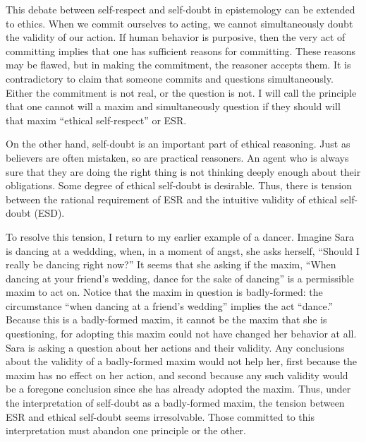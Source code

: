 \begin{isabellebody}
\begin{isamarkuptext}
This debate between self-respect and self-doubt in epistemology can be extended to ethics. When we 
commit ourselves to acting, we cannot simultaneously doubt the validity of our action. If human 
behavior is purposive, then the very act of committing implies that one has sufficient reasons for 
committing. These reasons may be flawed, but in making the commitment, the reasoner accepts them. It 
is contradictory to claim that someone commits and questions simultaneously. Either the commitment 
is not real, or the question is not. I will call the principle that one cannot will a maxim and 
simultaneously question if they should will that maxim ``ethical self-respect'' or ESR.

On the other hand, self-doubt is an important part of ethical reasoning. Just as believers are often 
mistaken, so are practical reasoners. An agent who is always sure that they are doing the right thing 
is not thinking deeply enough about their obligations. Some degree of ethical self-doubt is desirable. 
Thus, there is tension between the rational requirement of ESR and the intuitive validity of ethical 
self-doubt (ESD).

To resolve this tension, I return to my earlier example of a dancer. Imagine Sara is dancing at a 
weddding, when, in a moment of angst, she asks herself, ``Should I really be dancing right now?'' 
It seems that she asking if the maxim, ``When dancing at your friend's wedding, dance for the sake 
of dancing'' is a permissible maxim to act on. Notice that the maxim in question is badly-formed: the 
circumstance ``when dancing at a friend's wedding'' implies the act ``dance.'' Because this is a 
badly-formed maxim, it cannot be the maxim that she is questioning, for adopting
this maxim could not have changed her behavior at all. Sara is asking a question about her actions and 
their validity. Any conclusions about the validity of a badly-formed maxim would not help her, first because 
the maxim has no effect on her action, and second because any such validity would be a foregone conclusion
since she has already adopted the maxim. Thus, under the interpretation of self-doubt as a badly-formed 
maxim, the tension between ESR and ethical self-doubt seems irresolvable. Those committed to this 
interpretation must abandon one principle or the other.


\end{isamarkuptext}
\end{isabellebody}
